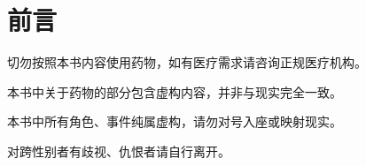 \section{前言}

切勿按照本书内容使用药物，如有医疗需求请咨询正规医疗机构。

本书中关于药物的部分包含虚构内容，并非与现实完全一致。

本书中所有角色、事件纯属虚构，请勿对号入座或映射现实。

对跨性别者有歧视、仇恨者请自行离开。\cite{transky}
